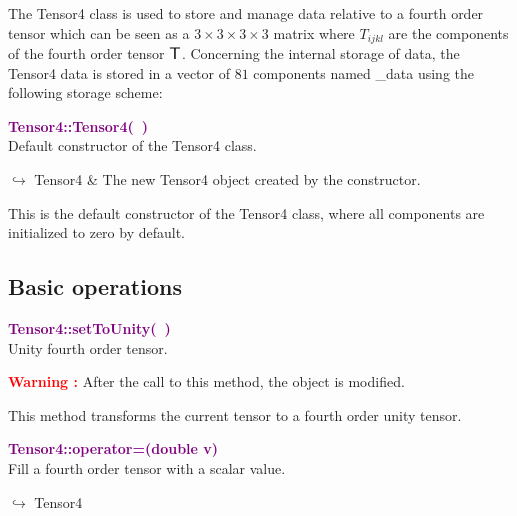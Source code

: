 The Tensor4 class is used to store and manage data relative to a fourth order tensor which can be seen as a $3\times3\times3\times3$ matrix where $T_{ijkl}$ are the components of the fourth order tensor $\mbox{\large\ensuremath{\mathsf{T}}}$.
Concerning the internal storage of data, the Tensor4 data is stored in a vector of $81$ components named \textsf{\_data} using the following storage scheme:



\textcolor{purple}{\textbf{Tensor4::Tensor4(~)}}\label{Tensor4::Tensor4()}\\
Default constructor of the Tensor4 class.\vspace*{-0.5em}
\begin{tcolorbox}[grow to left by=-1cm, width=\textwidth-1cm,myArgs,tabularx={l|R}]
$\hookrightarrow$ Tensor4 & The new Tensor4 object created by the constructor.
\end{tcolorbox}

This is the default constructor of the Tensor4 class, where all components are initialized to zero by default.

\subsection{Basic operations}

\textcolor{purple}{\textbf{Tensor4::setToUnity(~)}}\label{Tensor4::setToUnity()}\\
Unity fourth order tensor.

\hspace*{10mm}\textcolor{red}{\textbf{Warning :}} After the call to this method, the object is modified.

This method transforms the current tensor to a fourth order unity tensor.

\textcolor{purple}{\textbf{Tensor4::operator=(double v)}}\label{Tensor4::operator=(double v)}\\
Fill a fourth order tensor with a scalar value.\vspace*{-0.5em}
\begin{tcolorbox}[grow to left by=-1cm, width=\textwidth-1cm,myArgs,tabularx={l|R}]
$\hookrightarrow$ Tensor4
\end{tcolorbox}

